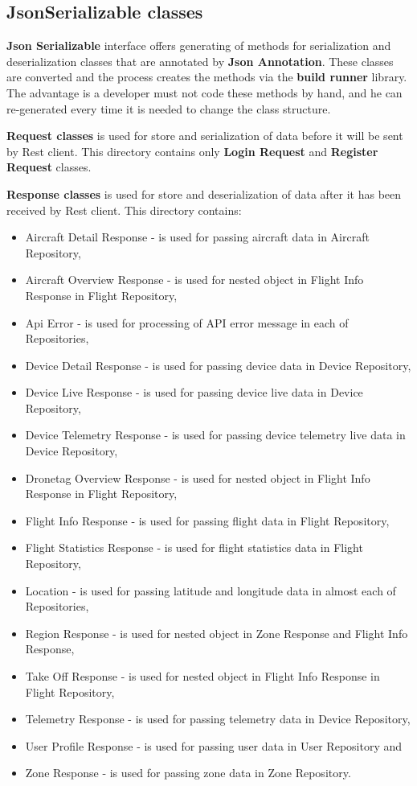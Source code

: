 \subsection{JsonSerializable classes}\label{subsec:jsonserializable-classes}
\textbf{Json Serializable} interface offers generating of methods for serialization and deserialization classes that are annotated by \textbf{Json Annotation}.
These classes are converted and the process creates the methods via the \textbf{build runner} library.
The advantage is a developer must not code these methods by hand, and he can re-generated every time it is needed to change the class structure.

\textbf{Request classes} is used for store and serialization of data before it will be sent by Rest client.
This directory contains only \textbf{Login Request} and \textbf{Register Request} classes.

\textbf{Response classes} is used for store and deserialization of data after it has been received by Rest client.
This directory contains:
\begin{itemize}
    \item Aircraft Detail Response - is used for passing aircraft data in Aircraft Repository,
    \item Aircraft Overview Response - is used for nested object in Flight Info Response in Flight Repository,
    \item Api Error - is used for processing of API error message in each of Repositories,
    \item Device Detail Response - is used for passing device data in Device Repository,
    \item Device Live Response - is used for passing device live data in Device Repository,
    \item Device Telemetry Response - is used for passing device telemetry live data in Device Repository,
    \item Dronetag Overview Response - is used for nested object in Flight Info Response in Flight Repository,
    \item Flight Info Response - is used for passing flight data in Flight Repository,
    \item Flight Statistics Response - is used for flight statistics data in Flight Repository,
    \item Location - is used for passing latitude and longitude data in almost each of Repositories,
    \item Region Response - is used for nested object in Zone Response and Flight Info Response,
    \item Take Off Response - is used for nested object in Flight Info Response in Flight Repository,
    \item Telemetry Response - is used for passing telemetry data in Device Repository,
    \item User Profile Response - is used for passing user data in User Repository and
    \item Zone Response - is used for passing zone data in Zone Repository.
\end{itemize}
